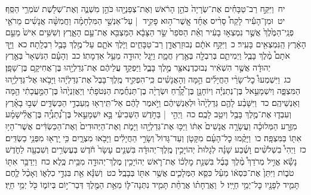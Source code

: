 \documentclass[18pt]{article}
\begin{document}
 {\loc יח~}וַיִּקַּ֣ח רַב־טַבָּחִ֗ים אֶת־שְׂרָיָה֙ כֹּהֵ֣ן הָרֹ֔אשׁ וְאֶת־צְפַנְיָ֖הוּ כֹּהֵ֣ן מִשְׁנֶ֑ה וְאֶת־שְׁלֹ֖שֶׁת שֹׁמְרֵ֥י הַסַּֽף׃ \startlock
 {\loc יט~}וּמִן־הָעִ֡יר לָקַח֩ סָרִ֨יס אֶחָ֜ד אֲֽשֶׁר־ה֥וּא פָקִ֣יד  |  עַל־אַנְשֵׁ֣י הַמִּלְחָמָ֗ה וַחֲמִשָּׁ֨ה אֲנָשִׁ֜ים מֵרֹאֵ֤י פְנֵֽי־הַמֶּ֙לֶךְ֙ אֲשֶׁ֣ר נִמְצְא֣וּ בָעִ֔יר וְאֵ֗ת הַסֹּפֵר֙ שַׂ֣ר הַצָּבָ֔א הַמַּצְבִּ֖א אֶת־עַ֣ם הָאָ֑רֶץ וְשִׁשִּׁ֥ים אִישׁ֙ מֵעַ֣ם הָאָ֔רֶץ הַֽנִּמְצְאִ֖ים בָּעִֽיר׃ \startlock
 {\loc כ~}וַיִּקַּ֣ח אֹתָ֔ם נְבוּזַרְאֲדָ֖ן רַב־טַבָּחִ֑ים וַיֹּ֧לֶךְ אֹתָ֛ם עַל־מֶ֥לֶךְ בָּבֶ֖ל רִבְלָֽתָה׃ \startlock
 {\loc כא~}וַיַּ֣ךְ אֹתָם֩ מֶ֨לֶךְ בָּבֶ֧ל וַיְמִיתֵ֛ם בְּרִבְלָ֖ה בְּאֶ֣רֶץ חֲמָ֑ת וַיִּ֥גֶל יְהוּדָ֖ה מֵעַ֥ל אַדְמָתֽוֹ׃ \startlock
 {\loc כב~}וְהָעָ֗ם הַנִּשְׁאָר֙ בְּאֶ֣רֶץ יְהוּדָ֔ה אֲשֶׁ֣ר הִשְׁאִ֔יר נְבוּכַדְנֶאצַּ֖ר מֶ֣לֶךְ בָּבֶ֑ל וַיַּפְקֵ֣ד עֲלֵיהֶ֔ם אֶת־גְּדַלְיָ֖הוּ בֶּן־אֲחִיקָ֥ם בֶּן־שָׁפָֽן׃ \startlock
 {\loc כג~}וַיִּשְׁמְעוּ֩ כׇל־שָׂרֵ֨י הַחֲיָלִ֜ים הֵ֣מָּה וְהָאֲנָשִׁ֗ים כִּֽי־הִפְקִ֤יד מֶֽלֶךְ־בָּבֶל֙ אֶת־גְּדַלְיָ֔הוּ וַיָּבֹ֥אוּ אֶל־גְּדַלְיָ֖הוּ הַמִּצְפָּ֑ה וְיִשְׁמָעֵ֣אל בֶּן־נְתַנְיָ֡ה וְיוֹחָנָ֣ן בֶּן־קָ֠רֵ֠חַ וּשְׂרָיָ֨ה בֶן־תַּנְחֻ֜מֶת הַנְּטֹפָתִ֗י וְיַאֲזַנְיָ֙הוּ֙ בֶּן־הַמַּ֣עֲכָתִ֔י הֵ֖מָּה וְאַנְשֵׁיהֶֽם׃ \startlock
 {\loc כד~}וַיִּשָּׁבַ֨ע לָהֶ֤ם גְּדַלְיָ֙הוּ֙ וּלְאַנְשֵׁיהֶ֔ם וַיֹּ֣אמֶר לָהֶ֔ם אַל־תִּֽירְא֖וּ מֵֽעַבְדֵ֣י הַכַּשְׂדִּ֑ים שְׁב֣וּ בָאָ֗רֶץ וְעִבְד֛וּ אֶת־מֶ֥לֶךְ בָּבֶ֖ל וְיִטַ֥ב לָכֶֽם׃ \startlock
 {\loc כה~}וַיְהִ֣י  |  בַּחֹ֣דֶשׁ הַשְּׁבִיעִ֗י בָּ֣א יִשְׁמָעֵ֣אל בֶּן־נְ֠תַנְיָ֠ה בֶּן־אֱלִ֨ישָׁמָ֜ע מִזֶּ֣רַע הַמְּלוּכָ֗ה וַעֲשָׂרָ֤ה אֲנָשִׁים֙ אִתּ֔וֹ וַיַּכּ֥וּ אֶת־גְּדַלְיָ֖הוּ וַיָּמֹ֑ת וְאֶת־הַיְּהוּדִים֙ וְאֶת־הַכַּשְׂדִּ֔ים אֲשֶׁר־הָי֥וּ אִתּ֖וֹ בַּמִּצְפָּֽה׃ \startlock
 {\loc כו~}וַיָּקֻ֨מוּ כׇל־הָעָ֜ם מִקָּטֹ֤ן וְעַד־גָּדוֹל֙ וְשָׂרֵ֣י הַחֲיָלִ֔ים וַיָּבֹ֖אוּ מִצְרָ֑יִם כִּ֥י יָֽרְא֖וּ מִפְּנֵ֥י כַשְׂדִּֽים׃ \startlock
 {\loc כז~}וַיְהִי֩ בִשְׁלֹשִׁ֨ים וָשֶׁ֜בַע שָׁנָ֗ה לְגָלוּת֙ יְהוֹיָכִ֣ין מֶֽלֶךְ־יְהוּדָ֔ה בִּשְׁנֵ֤ים עָשָׂר֙ חֹ֔דֶשׁ בְּעֶשְׂרִ֥ים וְשִׁבְעָ֖ה לַחֹ֑דֶשׁ נָשָׂ֡א אֱוִ֣יל מְרֹדַךְ֩ מֶ֨לֶךְ בָּבֶ֜ל בִּשְׁנַ֣ת מׇלְכ֗וֹ אֶת־רֹ֛אשׁ יְהוֹיָכִ֥ין מֶלֶךְ־יְהוּדָ֖ה מִבֵּ֥ית כֶּֽלֶא׃ \startlock
 {\loc כח~}וַיְדַבֵּ֥ר אִתּ֖וֹ טֹב֑וֹת וַיִּתֵּן֙ אֶת־כִּסְא֔וֹ מֵעַ֗ל כִּסֵּ֧א הַמְּלָכִ֛ים אֲשֶׁ֥ר אִתּ֖וֹ בְּבָבֶֽל׃ \startlock
 {\loc כט~}וְשִׁנָּ֕א אֵ֖ת בִּגְדֵ֣י כִלְא֑וֹ וְאָכַ֨ל לֶ֧חֶם תָּמִ֛יד לְפָנָ֖יו כׇּל־יְמֵ֥י חַיָּֽיו׃ \startlock
 {\loc ל~}וַאֲרֻחָת֗וֹ אֲרֻחַ֨ת תָּמִ֧יד נִתְּנָה־לּ֛וֹ מֵאֵ֥ת הַמֶּ֖לֶךְ דְּבַר־י֣וֹם בְּיוֹמ֑וֹ כֹּ֖ל יְמֵ֥י חַיָּֽו׃ 
    \pend 
    \endnumbering
    
\end{document}
